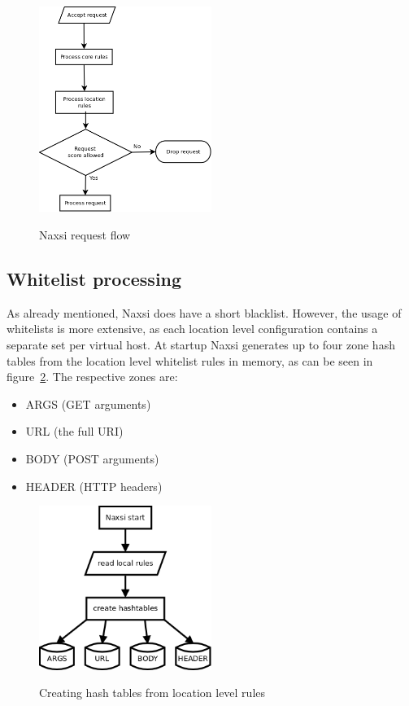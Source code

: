 \documentclass[Naxsi]{subfiles}
\begin{document}
\begin{figure}[h]
\caption{Naxsi request flow}
\centering
\includegraphics[width=0.5\textwidth] {images/naxsi_flow.png}
\label{fig:naxsi_flow}
\end{figure}

\subsection{Whitelist processing}
\label{sec:naxsi_whitelist}
As already mentioned, Naxsi does have a short blacklist. However, the usage of whitelists is more extensive, as each location level configuration contains a separate set per virtual host. At startup Naxsi generates up to four zone hash tables from the location level whitelist rules in memory, as can be seen in figure~\ref{fig:hashtables}. The respective zones are:
\begin{itemize}
	\item ARGS (GET arguments)
	\item URL (the full URI)
	\item BODY (POST arguments)
	\item HEADER (HTTP headers)
\end{itemize}

\begin{figure}[h]
\caption{Creating hash tables from location level rules}
\centering
\includegraphics[width=0.5\textwidth] {images/hashtables.png}
\label{fig:hashtables}
\end{figure}
\end{document}

